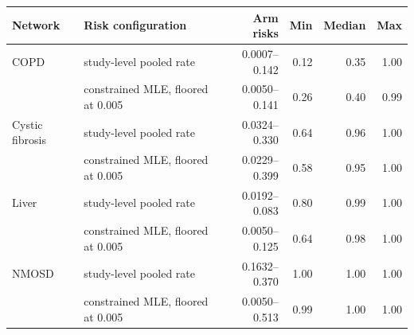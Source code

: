 \begin{tabular}{llrrrr}
\toprule
Network & Risk configuration & Arm risks & Min & Median & Max \\
\midrule
COPD & study-level pooled rate & 0.0007--0.142 & 0.12 & 0.35 & 1.00 \\
 & constrained MLE, floored at 0.005 & 0.0050--0.141 & 0.26 & 0.40 & 0.99 \\
Cystic fibrosis & study-level pooled rate & 0.0324--0.330 & 0.64 & 0.96 & 1.00 \\
 & constrained MLE, floored at 0.005 & 0.0229--0.399 & 0.58 & 0.95 & 1.00 \\
Liver & study-level pooled rate & 0.0192--0.083 & 0.80 & 0.99 & 1.00 \\
 & constrained MLE, floored at 0.005 & 0.0050--0.125 & 0.64 & 0.98 & 1.00 \\
NMOSD & study-level pooled rate & 0.1632--0.370 & 1.00 & 1.00 & 1.00 \\
 & constrained MLE, floored at 0.005 & 0.0050--0.513 & 0.99 & 1.00 & 1.00 \\
\bottomrule
\end{tabular}
